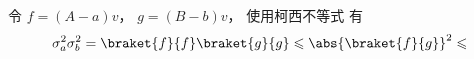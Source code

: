 

令 $f = (A-a)v$， $g = (B-b)v$， 使用柯西不等式 有
\begin{equation}
\sigma_a^2 \sigma_b^2 = \braket{f}{f} \braket{g}{g} \leqslant \abs{\braket{f}{g}}^2 \leqslant 
\end{equation}

